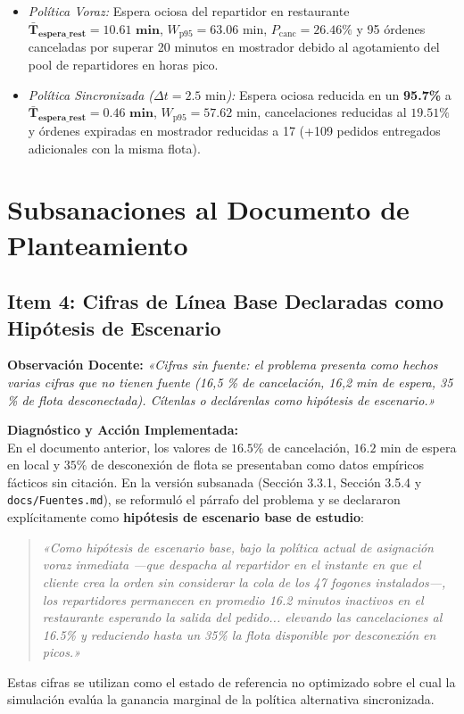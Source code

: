 \documentclass[11pt,letterpaper]{article}
\begin{document}
\begin{enumerate}[leftmargin=1.5em, itemsep=0.2em]
\begin{itemize}[leftmargin=1.2em]
        \item \textit{Política Voraz:} Espera ociosa del repartidor en restaurante $\mathbf{\bar{T}_{\text{espera\_rest}} = 10.61\text{ min}}$, $W_{\text{p95}} = 63.06\text{ min}$, $P_{\text{canc}} = 26.46\%$ y 95 órdenes canceladas por superar 20 minutos en mostrador debido al agotamiento del pool de repartidores en horas pico.
        \item \textit{Política Sincronizada ($\Delta t = 2.5\text{ min}$):} Espera ociosa reducida en un \textbf{95.7\%} a $\mathbf{\bar{T}_{\text{espera\_rest}} = 0.46\text{ min}}$, $W_{\text{p95}} = 57.62\text{ min}$, cancelaciones reducidas al $19.51\%$ y órdenes expiradas en mostrador reducidas a 17 (+109 pedidos entregados adicionales con la misma flota).
    \end{itemize}
\end{enumerate}

\section{Subsanaciones al Documento de Planteamiento}

\subsection{Item 4: Cifras de Línea Base Declaradas como Hipótesis de Escenario}
\noindent \textbf{Observación Docente:} \textit{«Cifras sin fuente: el problema presenta como hechos varias cifras que no tienen fuente (16,5 \% de cancelación, 16,2 min de espera, 35 \% de flota desconectada). Cítenlas o declárenlas como hipótesis de escenario.»}

\vspace{0.4em}
\noindent \textbf{Diagnóstico y Acción Implementada:} \\
En el documento anterior, los valores de $16.5\%$ de cancelación, $16.2\text{ min}$ de espera en local y $35\%$ de desconexión de flota se presentaban como datos empíricos fácticos sin citación. En la versión subsanada (Sección 3.3.1, Sección 3.5.4 y \texttt{docs/Fuentes.md}), se reformuló el párrafo del problema y se declararon explícitamente como \textbf{hipótesis de escenario base de estudio}:
\begin{quote}
\textit{«Como hipótesis de escenario base, bajo la política actual de asignación voraz inmediata —que despacha al repartidor en el instante en que el cliente crea la orden sin considerar la cola de los 47 fogones instalados—, los repartidores permanecen en promedio 16.2 minutos inactivos en el restaurante esperando la salida del pedido... elevando las cancelaciones al 16.5\% y reduciendo hasta un 35\% la flota disponible por desconexión en picos.»}
\end{quote}
Estas cifras se utilizan como el estado de referencia no optimizado sobre el cual la simulación evalúa la ganancia marginal de la política alternativa sincronizada.
\end{document}
